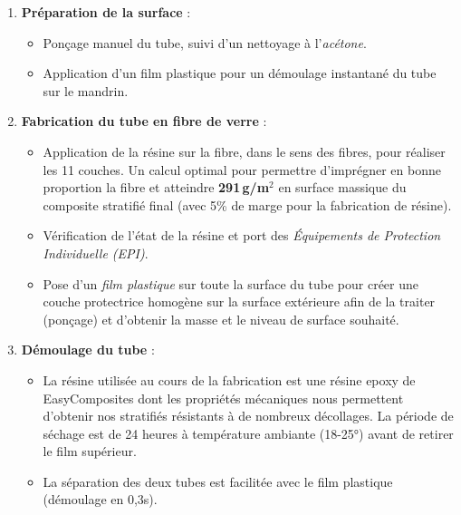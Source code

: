 \begin{enumerate}
    \item \textbf{Préparation de la surface} :
    \begin{itemize}
        \item Ponçage manuel du tube, suivi d'un nettoyage à l'\textit{acétone}.
        \item Application d'un film plastique pour un démoulage instantané du tube sur le mandrin.
    \end{itemize}

    \item \textbf{Fabrication du tube en fibre de verre} :
    \begin{itemize}
        \item Application de la résine sur la fibre, dans le sens des fibres, pour réaliser les 11 couches. Un calcul optimal pour permettre d'imprégner en bonne proportion la fibre et atteindre \textbf{291\,g/m$^2$} en surface massique du composite stratifié final (avec 5\% de marge pour la fabrication de résine).
        \item Vérification de l'état de la résine et port des \textit{Équipements de Protection Individuelle (EPI)}.
        \item Pose d'un \textit{film plastique} sur toute la surface du tube pour créer une couche protectrice homogène sur la surface extérieure afin de la traiter (ponçage) et d'obtenir la masse et le niveau de surface souhaité.
    \end{itemize}

    \item \textbf{Démoulage du tube} :
    \begin{itemize}
        \item La résine utilisée au cours de la fabrication est une résine epoxy de EasyComposites dont les propriétés mécaniques nous permettent d'obtenir nos stratifiés résistants à de nombreux décollages. La période de séchage est de 24 heures à température ambiante (18-25°) avant de retirer le film supérieur.
        \item La séparation des deux tubes est facilitée avec le film plastique (démoulage en 0,3s).
    \end{itemize}
\end{enumerate}


